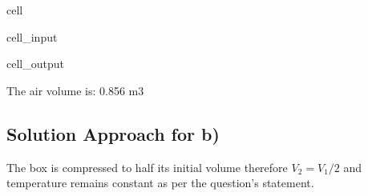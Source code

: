 \documentclass[letterpaper,10pt,english]{jupyterBook}
\begin{document}
\begin{sphinxuseclass}{cell}\begin{sphinxVerbatimInput}

\begin{sphinxuseclass}{cell_input}
\begin{sphinxVerbatim}[commandchars=\\\{\}]
   
   
     
   

         

  
\end{sphinxVerbatim}

\end{sphinxuseclass}\end{sphinxVerbatimInput}
\begin{sphinxVerbatimOutput}

\begin{sphinxuseclass}{cell_output}
\begin{sphinxVerbatim}[commandchars=\\\{\}]
The air volume is: 0.856 m3
\end{sphinxVerbatim}

\end{sphinxuseclass}\end{sphinxVerbatimOutput}

\end{sphinxuseclass}

\subsection{Solution Approach for b)}
\label{\detokenize{notebooks/Chapter3/CH3-Q3_edited_edited:solution-approach-for-b}}
\sphinxAtStartPar
The box is compressed to half its initial volume therefore \(V_2=V_1/2\) and temperature remains constant as per the question’s statement.
\end{document}
